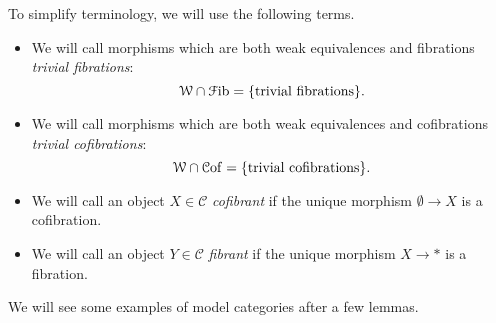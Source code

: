 \documentclass[main.tex]{subfiles}
\begin{document}
To simplify terminology, we will use the following terms.
\begin{itemize}
  \item We will call morphisms which are both weak equivalences and fibrations \emph{trivial fibrations}:
    \begin{equation*}
      \mathcal{W} \cap \mathcal{F}\mathrm{ib} = \{\text{trivial fibrations}\}.
    \end{equation*}

  \item We will call morphisms which are both weak equivalences and cofibrations \emph{trivial cofibrations}:
    \begin{equation*}
      \mathcal{W} \cap \mathcal{C}\mathrm{of} = \{\text{trivial cofibrations}\}.
    \end{equation*}

  \item We will call an object $X \in \mathcal{C}$ \emph{cofibrant} if the unique morphism $\emptyset \to X$ is a cofibration.

  \item We will call an object $Y \in \mathcal{C}$ \emph{fibrant} if the unique morphism $X \to *$ is a fibration.
\end{itemize}

We will see some examples of model categories after a few lemmas.
\end{document}
